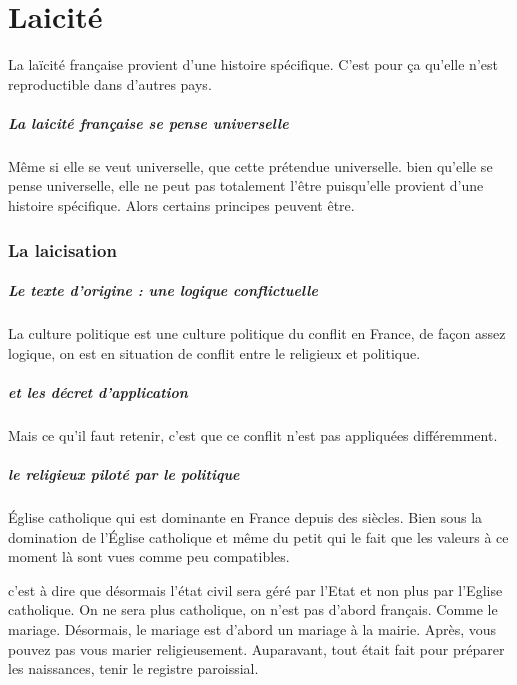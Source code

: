\chapter{Laicité}


 \begin{Synthesis}
     La laïcité française provient d'une histoire spécifique. C'est pour ça qu'elle n'est reproductible  dans d'autres pays.
     
 \end{Synthesis}
 

\paragraph{La laicité française se pense universelle} Même si elle se veut universelle, que cette prétendue universelle. bien qu'elle se pense universelle, elle ne peut pas totalement l'être puisqu'elle provient d'une histoire spécifique. Alors certains principes peuvent être.

\subsection{La laicisation}
\paragraph{Le texte d'origine : une logique conflictuelle} 
La culture politique est une culture politique du conflit en France,  de façon assez logique, on est en situation de conflit entre le religieux et politique.
 
\paragraph{ et les décret d'application}  Mais ce qu'il faut retenir, c'est que ce conflit n'est pas appliquées différemment.

\paragraph{le religieux piloté par le politique}
Église catholique qui est dominante en France depuis des siècles. 
Bien sous la domination de l'Église catholique et même du petit qui le fait que les valeurs à ce moment là sont vues comme peu
compatibles.




\begin{Ex}[mariage]
    c'est à  dire que désormais l'état civil sera géré par l'Etat et non plus par l'Eglise catholique. On ne sera plus catholique, on n'est pas d'abord français. Comme le mariage. Désormais, le mariage est d'abord un mariage à  la mairie. Après, vous pouvez pas vous marier religieusement. Auparavant, tout était fait pour préparer les naissances, tenir le registre paroissial.
\end{Ex}

